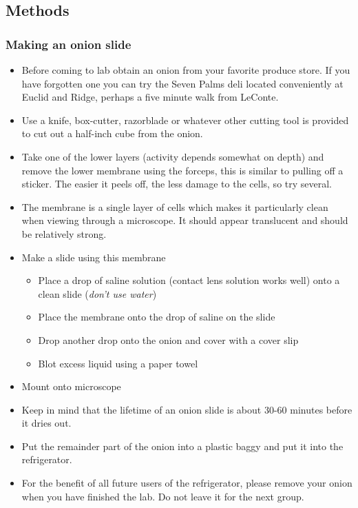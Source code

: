 \documentclass{../lab}
\begin{document}
\subsection{Methods}

\subsubsection{Making an onion slide}

\begin{itemize}
    \item Before coming to lab obtain an onion from your favorite produce store. If you have forgotten one you can try the Seven Palms deli located conveniently at Euclid and Ridge, perhaps a five minute walk from LeConte.

    \item Use a knife, box-cutter, razorblade or whatever other cutting tool is provided to cut out a half-inch cube from the onion.

    \item Take one of the lower layers (activity depends somewhat on depth) and remove the lower membrane using the forceps, this is similar to pulling off a sticker. The easier it peels off, the less damage to the cells, so try several.

    \item The membrane is a single layer of cells which makes it particularly clean when viewing through a microscope. It should appear translucent and should be relatively strong.

    \item Make a slide using this membrane

    \begin{itemize}
        \item Place a drop of saline solution (contact lens solution works well) onto a clean slide (\emph{don't use water})

        \item Place the membrane onto the drop of saline on the slide

        \item Drop another drop onto the onion and cover with a cover slip

        \item Blot excess liquid using a paper towel

    \end{itemize}

    \item Mount onto microscope

    \item Keep in mind that the lifetime of an onion slide is about 30-60 minutes before it dries out.

    \item Put the remainder part of the onion into a plastic baggy and put it into the refrigerator.

    \item For the benefit of all future users of the refrigerator, please remove your onion when you have finished the lab. Do not leave it for the next group.

\end{itemize}
\end{document}
